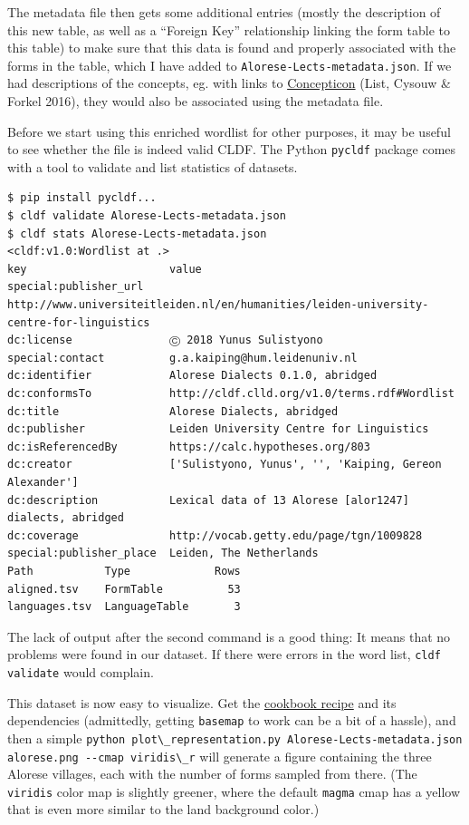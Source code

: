 \documentclass[
  a4paper,
  14pt,
  oneside,
  tablecaptionabove
]{scrbook}
\newcommand{\passthrough}[1]{#1}
\begin{document}
The metadata file then gets some additional entries (mostly the
description of this new table, as well as a \enquote{Foreign Key}
relationship linking the form table to this table) to make sure that
this data is found and properly associated with the forms in the table,
which I have added to
\passthrough{\lstinline!Alorese-Lects-metadata.json!}. If we had
descriptions of the concepts, eg. with links to
\href{https://concepticon.clld.org}{Concepticon} (List, Cysouw \& Forkel
2016), they would also be associated using the metadata file.

Before we start using this enriched wordlist for other purposes, it may
be useful to see whether the file is indeed valid CLDF. The Python
\passthrough{\lstinline!pycldf!} package comes with a tool to validate
and list statistics of datasets.

\begin{lstlisting}
$ pip install pycldf...
$ cldf validate Alorese-Lects-metadata.json
$ cldf stats Alorese-Lects-metadata.json
<cldf:v1.0:Wordlist at .>
key                      value
special:publisher_url    http://www.universiteitleiden.nl/en/humanities/leiden-university-centre-for-linguistics
dc:license               Ⓒ 2018 Yunus Sulistyono
special:contact          g.a.kaiping@hum.leidenuniv.nl
dc:identifier            Alorese Dialects 0.1.0, abridged
dc:conformsTo            http://cldf.clld.org/v1.0/terms.rdf#Wordlist
dc:title                 Alorese Dialects, abridged
dc:publisher             Leiden University Centre for Linguistics
dc:isReferencedBy        https://calc.hypotheses.org/803
dc:creator               ['Sulistyono, Yunus', '', 'Kaiping, Gereon Alexander']
dc:description           Lexical data of 13 Alorese [alor1247] dialects, abridged
dc:coverage              http://vocab.getty.edu/page/tgn/1009828
special:publisher_place  Leiden, The Netherlands
Path           Type             Rows
aligned.tsv    FormTable          53
languages.tsv  LanguageTable       3
\end{lstlisting}

The lack of output after the second command is a good thing: It means
that no problems were found in our dataset. If there were errors in the
word list, \passthrough{\lstinline!cldf validate!} would complain.

This dataset is now easy to visualize. Get the
\href{https://github.com/cldf/cookbook/tree/master/recipes/plot_representation}{cookbook
recipe} and its dependencies (admittedly, getting
\passthrough{\lstinline!basemap!} to work can be a bit of a hassle), and
then a simple
\passthrough{\lstinline!python plot\_representation.py Alorese-Lects-metadata.json alorese.png --cmap viridis\_r!}
will generate a figure containing the three Alorese villages, each with
the number of forms sampled from there. (The
\passthrough{\lstinline!viridis!} color map is slightly greener, where
the default \passthrough{\lstinline!magma!} cmap has a yellow that is
even more similar to the land background color.)
\end{document}
